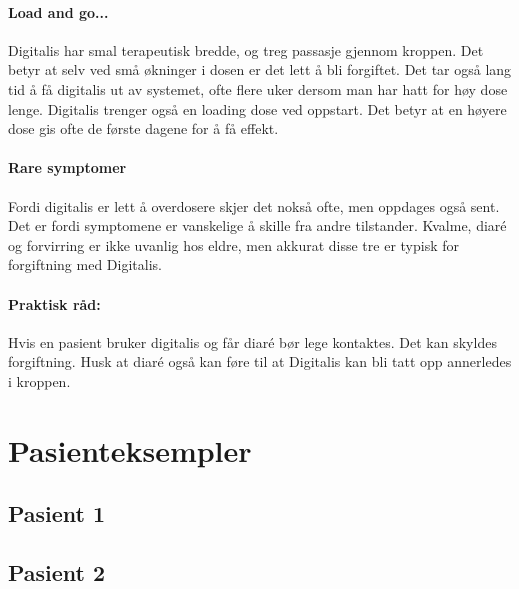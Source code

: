 				\paragraph{Load and go...\\}
					Digitalis har smal terapeutisk bredde, og treg passasje gjennom kroppen. Det betyr at selv ved små økninger i dosen er det lett å bli forgiftet. Det tar også lang tid å få digitalis ut av systemet, ofte flere uker dersom man har hatt for høy dose lenge. Digitalis trenger også en loading dose ved oppstart. Det betyr at en høyere dose gis ofte de første dagene for å få effekt.
				\paragraph{Rare symptomer\\}
					Fordi digitalis er lett å overdosere skjer det nokså ofte, men oppdages også sent. Det er fordi symptomene er vanskelige å skille fra andre tilstander. Kvalme, diaré og forvirring er ikke uvanlig hos eldre, men akkurat disse tre er typisk for forgiftning med Digitalis.
				\paragraph{Praktisk råd:\\}
					Hvis en pasient bruker digitalis og får diaré bør lege kontaktes. Det kan skyldes forgiftning. Husk at diaré også kan føre til at Digitalis kan bli tatt opp annerledes i kroppen.
		\section{Pasienteksempler}
			\subsection{Pasient 1}
			\subsection{Pasient 2}



\newpage
